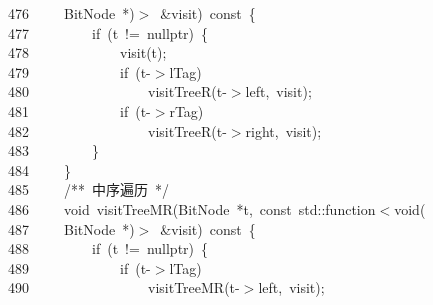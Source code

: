 \documentclass[11pt,a4paper]{ctexart}
\newcommand{\hlstd}[1]{\textcolor[rgb]{0.2,0.2,0.2}{#1}}
\newcommand{\hlcom}[1]{\textcolor[rgb]{0.59,0.59,0.59}{#1}}
\newcommand{\hlopt}[1]{\textcolor[rgb]{0.2,0.2,0.2}{#1}}
\newcommand{\hllin}[1]{\textcolor[rgb]{0.59,0.59,0.59}{#1}}
\newcommand{\hlkwa}[1]{\textcolor[rgb]{0.23,0.42,0.78}{#1}}
\newcommand{\hlkwb}[1]{\textcolor[rgb]{0.63,0,0.31}{#1}}
\newcommand{\hlkwc}[1]{\textcolor[rgb]{0,0.63,0.31}{#1}}
\newcommand{\hlkwd}[1]{\textcolor[rgb]{0.78,0.23,0.41}{#1}}
\begin{document}
\hllin{476\ }\hlstd{}\hlstd{\ \ \ \ }\hlstd{BitNode\ }\hlopt{{*})$>$\ \&}\hlstd{visit}\hlopt{)\ }\hlstd{}\hlkwb{const\ }\hlstd{}\hlopt{\{}\\
\hllin{477\ }\hlstd{}\hlstd{\ \ \ \ \ \ \ \ }\hlstd{}\hlkwa{if\ }\hlstd{}\hlopt{(}\hlstd{t\ }\hlopt{!=\ }\hlstd{}\hlkwc{nullptr}\hlstd{}\hlopt{)\ \{}\\
\hllin{478\ }\hlstd{}\hlstd{\ \ \ \ \ \ \ \ \ \ \ \ }\hlstd{}\hlkwd{visit}\hlstd{}\hlopt{(}\hlstd{t}\hlopt{);}\\
\hllin{479\ }\hlstd{}\hlstd{\ \ \ \ \ \ \ \ \ \ \ \ }\hlstd{}\hlkwa{if\ }\hlstd{}\hlopt{(}\hlstd{t}\hlopt{{-}$>$}\hlstd{lTag}\hlopt{)}\\
\hllin{480\ }\hlstd{}\hlstd{\ \ \ \ \ \ \ \ \ \ \ \ \ \ \ \ }\hlstd{}\hlkwd{visitTreeR}\hlstd{}\hlopt{(}\hlstd{t}\hlopt{{-}$>$}\hlstd{left}\hlopt{,\ }\hlstd{visit}\hlopt{);}\\
\hllin{481\ }\hlstd{}\hlstd{\ \ \ \ \ \ \ \ \ \ \ \ }\hlstd{}\hlkwa{if\ }\hlstd{}\hlopt{(}\hlstd{t}\hlopt{{-}$>$}\hlstd{rTag}\hlopt{)}\\
\hllin{482\ }\hlstd{}\hlstd{\ \ \ \ \ \ \ \ \ \ \ \ \ \ \ \ }\hlstd{}\hlkwd{visitTreeR}\hlstd{}\hlopt{(}\hlstd{t}\hlopt{{-}$>$}\hlstd{right}\hlopt{,\ }\hlstd{visit}\hlopt{);}\\
\hllin{483\ }\hlstd{}\hlstd{\ \ \ \ \ \ \ \ }\hlstd{}\hlopt{\}}\\
\hllin{484\ }\hlstd{}\hlstd{\ \ \ \ }\hlstd{}\hlopt{\}}\\
\hllin{485\ }\hlstd{}\hlstd{\ \ \ \ }\hlstd{}\hlcom{/{*}{*}\ 中序遍历\ {*}/}\hlstd{}\\
\hllin{486\ }\hlstd{}\hlstd{\ \ \ \ }\hlstd{}\hlkwb{void\ }\hlstd{}\hlkwd{visitTreeMR}\hlstd{}\hlopt{(}\hlstd{BitNode\ }\hlopt{{*}}\hlstd{t}\hlopt{,\ }\hlstd{}\hlkwb{const\ }\hlstd{}\hlkwc{std}\hlstd{}\hlopt{::}\hlstd{function}\hlopt{$<$}\hlstd{}\hlkwb{void}\hlstd{}\hlopt{(}\Righttorque\\
\hllin{487\ }\hlstd{}\hlstd{\ \ \ \ }\hlstd{BitNode\ }\hlopt{{*})$>$\ \&}\hlstd{visit}\hlopt{)\ }\hlstd{}\hlkwb{const\ }\hlstd{}\hlopt{\{}\\
\hllin{488\ }\hlstd{}\hlstd{\ \ \ \ \ \ \ \ }\hlstd{}\hlkwa{if\ }\hlstd{}\hlopt{(}\hlstd{t\ }\hlopt{!=\ }\hlstd{}\hlkwc{nullptr}\hlstd{}\hlopt{)\ \{}\\
\hllin{489\ }\hlstd{}\hlstd{\ \ \ \ \ \ \ \ \ \ \ \ }\hlstd{}\hlkwa{if\ }\hlstd{}\hlopt{(}\hlstd{t}\hlopt{{-}$>$}\hlstd{lTag}\hlopt{)}\\
\hllin{490\ }\hlstd{}\hlstd{\ \ \ \ \ \ \ \ \ \ \ \ \ \ \ \ }\hlstd{}\hlkwd{visitTreeMR}\hlstd{}\hlopt{(}\hlstd{t}\hlopt{{-}$>$}\hlstd{left}\hlopt{,\ }\hlstd{visit}\hlopt{);}\\
\end{document}
